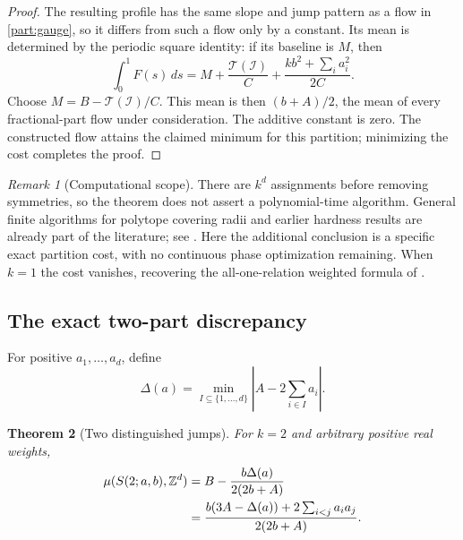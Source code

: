 \documentclass[11pt,a4paper]{article}
\newtheorem{theorem}{Theorem}[section]
\theoremstyle{remark}\newtheorem{remark}[theorem]{Remark}
\begin{document}
\begin{proof}
The resulting profile has the same slope and jump pattern as a flow
in \eqref{part:gauge}, so it differs from such a flow only by a
constant.  Its mean is determined by the periodic square identity:
if its baseline is $M$, then
\[
 \int_0^1F(s)\,ds
 =M+\frac{\mathcal T(\mathcal I)}C
       +\frac{kb^2+\sum_i a_i^2}{2C}.
\]
Choose $M=B-\mathcal T(\mathcal I)/C$.  This mean is then
$(b+A)/2$, the mean of every fractional-part flow under consideration.
The additive constant is zero.  The constructed flow attains the
claimed minimum for this partition; minimizing the cost completes
the proof.
\end{proof}

\begin{remark}[Computational scope]\label{part:scope}
There are $k^d$ assignments before removing symmetries, so the theorem
does not assert a polynomial-time algorithm.  General finite
algorithms for polytope covering radii and earlier hardness results
are already part of the literature; see \cite{CGNS}.  Here the
additional conclusion is a specific exact partition cost, with no
continuous phase optimization remaining.  When $k=1$ the cost
vanishes, recovering the all-one-relation weighted formula of
\cite[Theorem 1.4]{CSS}.
\end{remark}

\subsection{The exact two-part discrepancy}

For positive $a_1,\ldots,a_d$, define
\begin{equation}\label{part:discrepancy}
 \Delta(a)=\min_{I\subseteq\{1,\ldots,d\}}
       \left|A-2\sum_{i\in I}a_i\right|.
\end{equation}

\begin{theorem}[Two distinguished jumps]\label{part:two}
For $k=2$ and arbitrary positive real weights,
\begin{align}
 \mu(S(2;a,b),\mathbb Z^d)
 &=B-\frac{b\Delta(a)}{2(2b+A)}\label{part:twoeq}\\
 &=\frac{b(3A-\Delta(a))+2\sum_{i<j}a_i a_j}
           {2(2b+A)}.\nonumber
\end{align}
\end{theorem}
\end{document}
